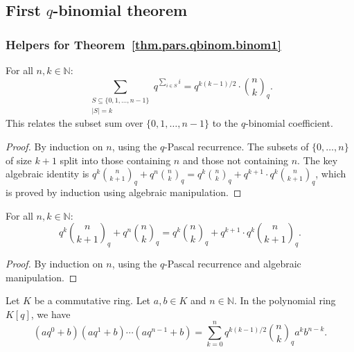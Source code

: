\subsection{First $q$-binomial theorem}

\subsubsection{Helpers for Theorem~\ref{thm.pars.qbinom.binom1}}

\begin{lemma}
\label{lem.qbinomial-formulas.subset-sum-formula}
\leanhelper
\leanok
For all $n, k \in \mathbb{N}$:
\[
\sum_{\substack{S \subseteq \{0,1,\ldots,n-1\} \\ |S|=k}} q^{\sum_{i \in S} i}
= q^{k(k-1)/2} \cdot \binom{n}{k}_q.
\]
This relates the subset sum over $\{0,1,\ldots,n-1\}$ to the $q$-binomial coefficient.
\end{lemma}

\begin{proof}
\leanok
By induction on $n$, using the $q$-Pascal recurrence. The subsets of $\{0,\ldots,n\}$
of size $k{+}1$ split into those containing $n$ and those not containing $n$.
The key algebraic identity is
$q^k \binom{n}{k+1}_q + q^n \binom{n}{k}_q = q^k \binom{n}{k}_q + q^{k+1} \cdot q^k \binom{n}{k+1}_q$,
which is proved by induction using algebraic manipulation.
\end{proof}

\begin{lemma}
\label{lem.qbinomial-formulas.qbinom-induction-identity}
\leanhelper
\leanok
For all $n, k \in \mathbb{N}$:
\[
q^k \binom{n}{k+1}_q + q^n \binom{n}{k}_q
= q^k \binom{n}{k}_q + q^{k+1} \cdot q^k \binom{n}{k+1}_q.
\]
\end{lemma}

\begin{proof}
\leanok
By induction on $n$, using the $q$-Pascal recurrence and algebraic manipulation.
\end{proof}

\begin{theorem}
\label{thm.pars.qbinom.binom1}
\leantarget
\leanok
Let $K$ be a
commutative ring. Let $a,b\in K$ and $n\in\mathbb{N}$. In the polynomial ring
$K\left[  q\right]  $, we have
\[
\left(  aq^{0}+b\right)  \left(  aq^{1}+b\right)  \cdots\left(  aq^{n-1}%
+b\right)  =\sum_{k=0}^{n}q^{k\left(  k-1\right)  /2}\binom{n}{k}_{q}%
a^{k}b^{n-k}.
\]
\end{theorem}

